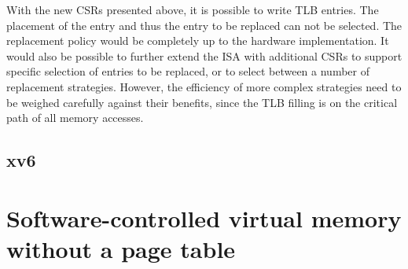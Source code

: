 With the new CSRs presented above, it is possible to write TLB entries.
The placement of the entry and thus the entry to be replaced can not be selected.
The replacement policy would be completely up to the hardware implementation.
It would also be possible to further extend the ISA with additional CSRs to
support specific selection of entries to be replaced, or to select between
a number of replacement strategies.
However, the efficiency of more complex strategies need to be weighed carefully
against their benefits, since the TLB filling is on the critical path of all
memory accesses.





\subsection{xv6}





\section{Software-controlled virtual memory without a page table}
